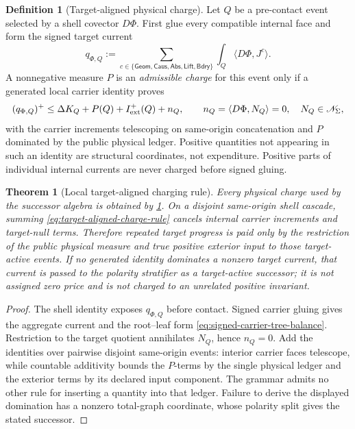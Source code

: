 \documentclass[11pt]{article}
\numberwithin{section}{part}
\theoremstyle{plain}
\newtheorem{theorem}{Theorem}[section]
\theoremstyle{definition}
\newtheorem{definition}[definition]{Definition}
\theoremstyle{remark}
\newcommand{\Geom}{\mathsf{Geom}}
\newcommand{\Caus}{\mathsf{Caus}}
\newcommand{\Abs}{\mathsf{Abs}}
\newcommand{\Lift}{\mathsf{Lift}}
\newcommand{\Bdry}{\mathsf{Bdry}}
\newcommand{\Null}{\mathscr N}
\begin{document}
\begin{definition}[Target-aligned physical charge]
\label{def:target-aligned-physical-charge}
Let \(Q\) be a pre-contact event selected by a shell covector \(D\Phi\).
First glue every compatible internal face and form the signed target current
\begin{equation}
 \label{eq:aggregate-target-current}
 q_{\Phi,Q}:=
 \sum_{c\in\{\Geom,\Caus,\Abs,\Lift,\Bdry\}}
 \int_Q\langle D\Phi,J^c\rangle .
\end{equation}
A nonnegative measure \(P\) is an \emph{admissible charge} for this event
only if a generated local carrier identity proves
\begin{equation}
 \label{eq:target-aligned-charge-rule}
 (q_{\Phi,Q})^+
 \le \Delta K_Q+P(Q)+I_{\rm ext}^+(Q)+n_Q,
 \qquad n_Q=\langle D\Phi,N_Q\rangle=0,
 \quad N_Q\in\Null_\Sigma,
\end{equation}
with the carrier increments telescoping on same-origin concatenation and
\(P\) dominated by the public physical ledger.  Positive quantities not
appearing in such an identity are structural coordinates, not expenditure.
Positive parts of individual internal currents are never charged before
signed gluing.
\end{definition}

\begin{theorem}[Local target-aligned charging rule]
\label{thm:local-target-aligned-charging-rule}
Every physical charge used by the successor algebra is obtained by
\cref{def:target-aligned-physical-charge}.  On a disjoint same-origin shell
cascade, summing \eqref{eq:target-aligned-charge-rule} cancels internal
carrier increments and target-null terms.  Therefore repeated target
progress is paid only by the restriction of the public physical measure and
true positive exterior input to those target-active events.  If no generated
identity dominates a nonzero target current, that current is passed to the
polarity stratifier as a target-active successor; it is not assigned zero
price and is not charged to an unrelated positive invariant.
\end{theorem}

\begin{proof}
The shell identity exposes \(q_{\Phi,Q}\) before contact.  Signed carrier
gluing gives the aggregate current and the root--leaf form
\eqref{eq:signed-carrier-tree-balance}.  Restriction to the target quotient
annihilates \(N_Q\), hence \(n_Q=0\).  Add the identities over pairwise disjoint same-origin
events: interior carrier faces telescope, while countable additivity bounds
the \(P\)-terms by the single physical ledger and the exterior terms by its
declared input component.  The grammar admits no other rule for inserting a
quantity into that ledger.  Failure to derive the displayed domination has
a nonzero total-graph coordinate, whose polarity split gives the stated
successor.
\end{proof}
\end{document}

